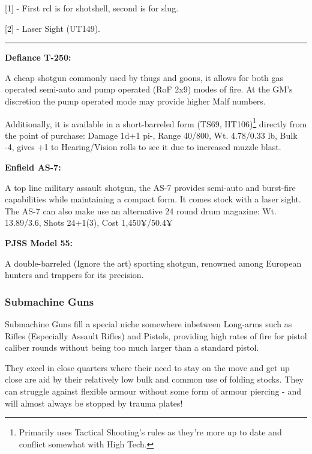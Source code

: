 [1] - First rcl is for shotshell, second is for slug.

[2] - Laser Sight (UT149).

\par\rule{\textwidth}{0.5pt} 

\begin{mdframed}[linewidth=0pt]
\begin{multicols}{2}
	
	\textbf{Defiance T-250:}
	
	A cheap shotgun commonly used by thugs and goons, it allows for both gas operated semi-auto and pump operated (RoF 2x9) modes of fire. At the GM's discretion the pump operated mode may provide higher Malf numbers.
	
	Additionally, it is available in a short-barreled form (TS69, HT106)\footnote{Primarily uses Tactical Shooting's rules as they're more up to date and conflict somewhat with High Tech.} directly from the point of purchase: Damage 1d+1 pi-, Range 40/800, Wt. 4.78/0.33 lb, Bulk -4, gives +1 to Hearing/Vision rolls to see it due to increased muzzle blast.
	
	\textbf{Enfield AS-7:}
	
	A top line military assault shotgun, the AS-7 provides semi-auto and burst-fire capabilities while maintaining a compact form. It comes stock with a laser sight.
	The AS-7 can also make use an alternative 24 round drum magazine: Wt. 13.89/3.6, Shots 24+1(3), Cost 1,450¥/50.4¥
	
	\textbf{PJSS Model 55:}
	
	A double-barreled (Ignore the art) sporting shotgun, renowned among European hunters and trappers for its precision.

\end{multicols}
\end{mdframed}

\subsubsection{Submachine Guns}

Submachine Guns fill a special niche somewhere inbetween Long-arms such as Rifles (Especially Assault Rifles) and Pistols, providing high rates of fire for pistol caliber rounds without being too much larger than a standard pistol. 

They excel in close quarters where their need to stay on the move and get up close are aid by their relatively low bulk and common use of folding stocks. They can struggle against flexible armour without some form of armour piercing - and will almost always be stopped by trauma plates!

